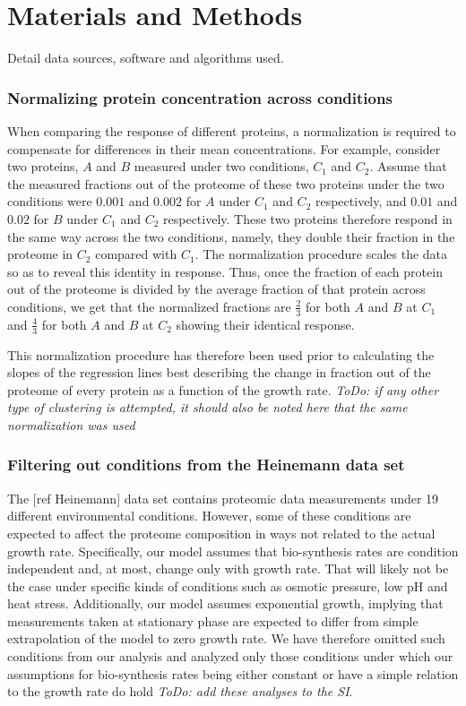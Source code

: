 \documentclass[notitlepage]{article}
\begin{document}
\section{Materials and Methods}
Detail data sources, software and algorithms used.
\subsubsection{Normalizing protein concentration across conditions}
\label{concacrossconds}
When comparing the response of different proteins, a normalization is required to compensate for differences in their mean concentrations.
For example, consider two proteins, $A$ and $B$ measured under two conditions, $C_1$ and $C_2$.
Assume that the measured fractions out of the proteome of these two proteins under the two conditions were $0.001$ and $0.002$ for $A$ under $C_1$ and $C_2$ respectively, and $0.01$ and $0.02$ for $B$ under $C_1$ and $C_2$ respectively.
These two proteins therefore respond in the same way across the two conditions, namely, they double their fraction in the proteome in $C_2$ compared with $C_1$.
The normalization procedure scales the data so as to reveal this identity in response.
Thus, once the fraction of each protein out of the proteome is divided by the average fraction of that protein across conditions, we get that the normalized fractions are $\frac{2}{3}$ for both $A$ and $B$ at $C_1$ and $\frac{4}{3}$ for both $A$ and $B$ at $C_2$ showing their identical response.

This normalization procedure has therefore been used prior to calculating the slopes of the regression lines best describing the change in fraction out of the proteome of every protein as a function of the growth rate.
\emph{ToDo: if any other type of clustering is attempted, it should also be noted here that the same normalization was used}
\subsubsection{Filtering out conditions from the Heinemann data set}
\label{heinemanncond}
The [ref Heinemann] data set contains proteomic data measurements under 19 different environmental conditions.
However, some of these conditions are expected to affect the proteome composition in ways not related to the actual growth rate.
Specifically, our model assumes that bio-synthesis rates are condition independent and, at most, change only with growth rate.
That will likely not be the case under specific kinds of conditions such as osmotic pressure, low pH and heat stress.
Additionally, our model assumes exponential growth, implying that measurements taken at stationary phase are expected to differ from simple extrapolation of the model to zero growth rate.
We have therefore omitted such conditions from our analysis and analyzed only those conditions under which our assumptions for bio-synthesis rates being either constant or have a simple relation to the growth rate do hold \emph{ToDo: add these analyses to the SI}.
\end{document}
